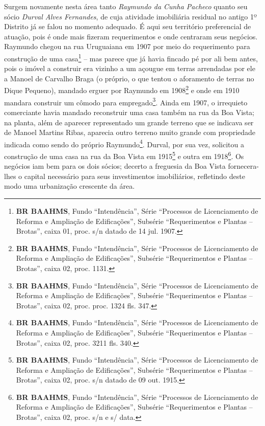 Surgem novamente nesta área tanto \textit{Raymundo da Cunha Pacheco} quanto seu sócio \textit{Durval Alves Fernandes}, de cuja atividade imobiliária residual no antigo 1º Distrito já se falou no momento adequado. É aqui seu território preferencial de atuação, pois é onde mais fizeram requerimentos e onde centraram seus negócios. Raymundo chegou na rua Uruguaiana em 1907 por meio do requerimento para construção de uma casa\footnote{\textbf{BR BAAHMS}, Fundo ``Intendência'', Série ``Processos de Licenciamento de Reforma e Ampliação de Edificações'', Subsérie ``Requerimentos e Plantas -- Brotas'', caixa 01, proc. s/n datado de 14 jul. 1907.} -- mas parece que já havia fincado pé por ali bem antes, pois o imóvel a construir era vizinho a um açougue em terras arrendadas por ele a Manoel de Carvalho Braga (o próprio, o que tentou o aforamento de terras no Dique Pequeno), mandado erguer por Raymundo em 1908\footnote{\textbf{BR BAAHMS}, Fundo ``Intendência'', Série ``Processos de Licenciamento de Reforma e Ampliação de Edificações'', Subsérie ``Requerimentos e Plantas -- Brotas'', caixa 02, proc. 1131.} e onde em 1910 mandara construir um cômodo para empregado\footnote{\textbf{BR BAAHMS}, Fundo ``Intendência'', Série ``Processos de Licenciamento de Reforma e Ampliação de Edificações'', Subsérie ``Requerimentos e Plantas -- Brotas'', caixa 02, proc. proc. 1324 fls. 347.}. Ainda em 1907, o irrequieto comerciante havia mandado reconstruir uma casa também na rua da Boa Vista; na planta, além de aparecer representado um grande terreno que se indicava ser de Manoel Martins Ribas, aparecia outro terreno muito grande com propriedade indicada como sendo do próprio Raymundo\footnote{\textbf{BR BAAHMS}, Fundo ``Intendência'', Série ``Processos de Licenciamento de Reforma e Ampliação de Edificações'', Subsérie ``Requerimentos e Plantas -- Brotas'', caixa 02, proc. 3211 fls. 340.}. Durval, por sua vez, solicitou a construção de uma casa na rua da Boa Vista em 1915\footnote{\textbf{BR BAAHMS}, Fundo ``Intendência'', Série ``Processos de Licenciamento de Reforma e Ampliação de Edificações'', Subsérie ``Requerimentos e Plantas -- Brotas'', caixa 02, proc. s/n datado de 09 out. 1915.} e outra em 1918\footnote{\textbf{BR BAAHMS}, Fundo ``Intendência'', Série ``Processos de Licenciamento de Reforma e Ampliação de Edificações'', Subsérie ``Requerimentos e Plantas -- Brotas'', caixa 02, proc. s/n e s/ data.}. Os negócios iam bem para os dois sócios; decerto a freguesia da Boa Vista fornecera-lhes o capital necessário para seus investimentos imobiliários, refletindo deste modo uma urbanização crescente da área. 

